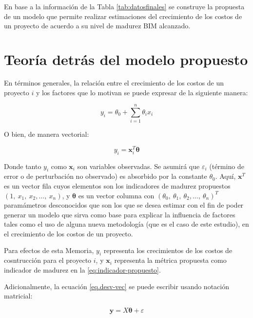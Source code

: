 En base a la información de la Tabla \ref{tab:datosfinales} se construye la propuesta de un modelo que permite realizar estimaciones del crecimiento de los costos de un proyecto de acuerdo a su nivel de madurez BIM alcanzado.

\section{Teoría detrás del modelo propuesto}

En términos generales, la relación entre el crecimiento de los costos de un proyecto $i$ y los factores que lo motivan se puede expresar de la siguiente manera:

\begin{equation}
    \label{eq.desv-gen}
    y_i = \theta_0 +\sum\limits_{i=1}^n \theta_i x_i
\end{equation}

O bien, de manera vectorial:

\begin{equation}
    \label{eq.desv-vec}
    y_i = \bm{x}^T_i\bm{\theta}
\end{equation}

Donde tanto $y_i$ como $\bm{x}_i$ son variables observadas. Se asumirá que $\varepsilon_i$ (término de error o de perturbación no observado) es absorbido por la constante $\theta_0$. Aquí, $\bm{x}^T$ es un vector fila cuyos elementos son los indicadores de madurez propuestos $(1,~x_1,~x_2,\ldots,~x_n)$, y $\bm{\theta}$ es un vector columna con $(\theta_0,~\theta_1,~\theta_2,\ldots,~\theta_n)^T$  paramámetros desconocidos que son los que se desea estimar con el fin de poder generar un modelo que sirva como base para explicar la influencia de factores tales como el uso de alguna nueva metodología (que es el caso de este estudio), en el crecimiento de los costos de un proyecto.

Para efectos de esta Memoria, $y_i$ representa los crecimientos de los costos de cosntrucción para el proyecto $i$, y $\bm{x}_i$ representa la métrica propuesta como indicador de madurez en la \eqref{eq:indicador-propuesto}.


Adicionalmente, la ecuación \eqref{eq.desv-vec} se puede escribir usando notación matricial:

\begin{equation}
    \label{eq.matrix}
    \bm{y} = X\bm{\theta} + \varepsilon
\end{equation}

